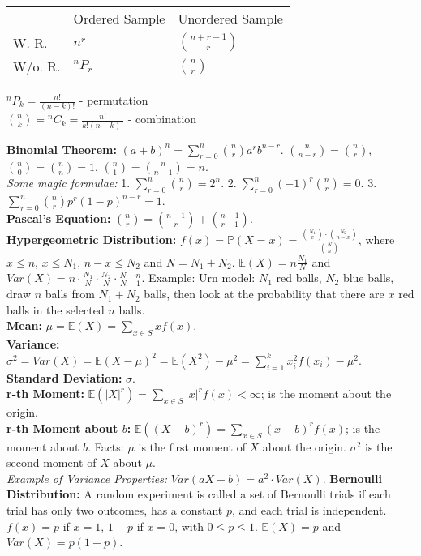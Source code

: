 \documentclass[10pt, twocolumn]{article}
\newcommand*{\Perm}[2]{{}^{#1}\!P_{#2}}%
\newcommand*{\Comb}[2]{{}^{#1}C_{#2}}%
\begin{document}
\begin{tabular}{lll}
        & Ordered Sample & Unordered Sample      \\
W. R.   & $n^r$          & ${n+r-1 \choose r}$ \\
W/o. R. & $\Perm{n}{r}$  & ${n \choose r}$   
\end{tabular}

$\Perm{n}{k}=\frac{n!}{(n-k)!}$ - permutation\\
$\binom nk=\Comb{n}{k}=\frac{n!}{k!(n-k)!}$ - combination

\textbf{Binomial Theorem:} $(a+b)^n = \sum_{r=0}^n {n \choose r} a^r b^{n-r}$. ${n \choose n-r} = {n \choose r}$, ${n \choose 0} = {n \choose n} = 1$, ${n \choose 1} = {n \choose n-1} = n$.\\
\textit{Some magic formulae:} 1. $\sum_{r=0}^n {n \choose r} = 2^n$. 2. $\sum_{r=0}^n (-1)^r {n \choose r} = 0$. 3. $\sum_{r=0}^n {n \choose r} p^r (1-p)^{n-r} = 1$.\\
\textbf{Pascal's Equation:} ${n \choose r} = {n-1 \choose r} + {n-1 \choose r-1}$.\\
\textbf{Hypergeometric Distribution:} $f(x) = \mathbb{P}(X=x) = \frac{{N_1 \choose x} \cdot {N_2 \choose n-x}}{{N \choose n}}$, where $x \leq n$, $x \leq N_1$, $n-x \leq N_2$ and $N = N_1 + N_2$. $\mathbb{E}(X) = n\frac{N_1}{N}$ and $Var(X) = n \cdot \frac{N_1}{N} \cdot \frac{N_2}{N} \cdot \frac{N-n}{N-1}$. Example: Urn model: $N_1$ red balls, $N_2$ blue balls, draw $n$ balls from $N_1 + N_2$ balls, then look at the probability that there are $x$ red balls in the selected $n$ balls.\\
\textbf{Mean:} $\mu = \mathbb{E}(X) = \sum_{x \in S} x f(x)$.\\
\textbf{Variance:} $\sigma^2 = Var(X) = \mathbb{E}(X - \mu)^2 = \mathbb{E}(X^2) - \mu^2 = \sum_{i=1}^{k} x_i^2 f(x_i) - \mu^2$. \textbf{Standard Deviation:} $\sigma$.\\
\textbf{r-th Moment:} $\mathbb{E}(|X|^r) = \sum_{x \in S} |x|^r f(x) < \infty$; is the moment about the origin.\\
\textbf{r-th Moment about $b$:} $\mathbb{E}((X-b)^r) = \sum_{x \in S} (x-b)^r f(x)$; is the moment about $b$. Facts: $\mu$ is the first moment of $X$ about the origin. $\sigma^2$ is the second moment of $X$ about $\mu$.\\
\textit{Example of Variance Properties:} $Var(aX+b) = a^2 \cdot Var(X)$.
\textbf{Bernoulli Distribution:} A random experiment is called a set of Bernoulli trials if each trial has only two outcomes, has a constant $p$, and each trial is independent. $f(x) = p$ if $x=1$, $1-p$ if $x=0$, with $0 \leq p \leq 1$. $\mathbb{E}(X) = p$ and $Var(X) = p(1-p)$.\\
\end{document}
